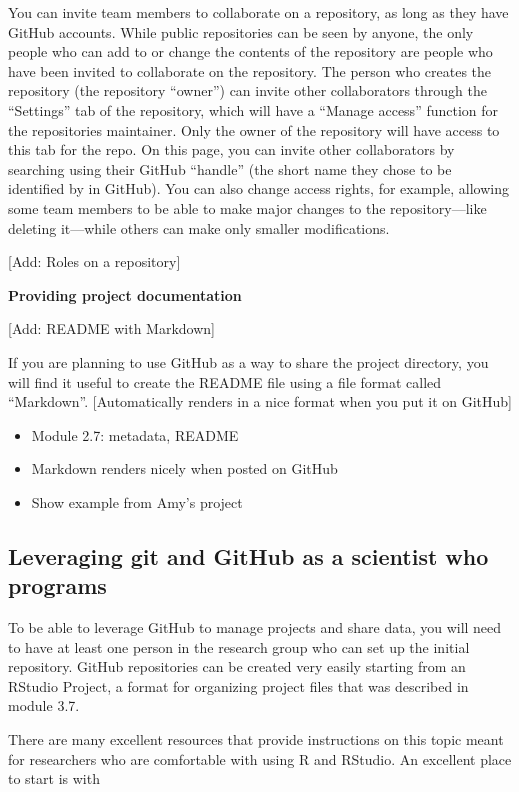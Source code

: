 \documentclass[]{tufte-book}
\providecommand{\tightlist}{%
  \setlength{\itemsep}{0pt}\setlength{\parskip}{0pt}}
\begin{document}
You can invite team members to collaborate on a repository, as long as they have
GitHub accounts. While public repositories can be seen by anyone, the only
people who can add to or change the contents of the repository are people who
have been invited to collaborate on the repository. The person who creates the
repository (the repository ``owner'') can invite other collaborators through the
``Settings'' tab of the repository, which will have a ``Manage access'' function for
the repositories maintainer. Only the owner of the repository will have access
to this tab for the repo. On this page, you can invite other collaborators by
searching using their GitHub ``handle'' (the short name they chose to be
identified by in GitHub). You can also change access rights, for example,
allowing some team members to be able to make major changes to the
repository---like deleting it---while others can make only smaller
modifications.

{[}Add: Roles on a repository{]}

\textbf{Providing project documentation}

{[}Add: README with Markdown{]}

If you are planning to use GitHub as a way to share the project directory, you
will find it useful to create the README file using a file format called
``Markdown''. {[}Automatically renders in a nice format when you put it on GitHub{]}

\begin{itemize}
\tightlist
\item
  Module 2.7: metadata, README
\item
  Markdown renders nicely when posted on GitHub
\item
  Show example from Amy's project
\end{itemize}

\subsection{Leveraging git and GitHub as a scientist who programs}\label{leveraging-git-and-github-as-a-scientist-who-programs}

To be able to leverage GitHub to manage projects and share data, you will need
to have at least one person in the research group who can set up the initial
repository. GitHub repositories can be created very easily starting from an
RStudio Project, a format for organizing project files that was described in
module 3.7.

There are many excellent resources that provide instructions on this topic
meant for researchers who are comfortable with using R and RStudio. An
excellent place to start is with
\end{document}
